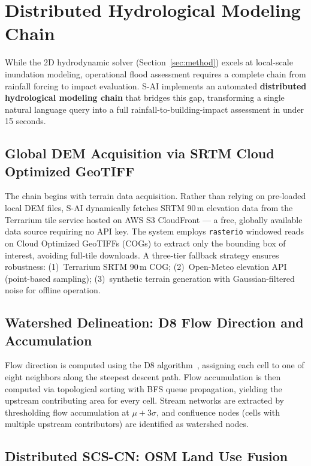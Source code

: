 \documentclass[11pt, a4paper]{article}
\begin{document}
\section{Distributed Hydrological Modeling Chain}
\label{sec:hydro}

While the 2D hydrodynamic solver (Section~\ref{sec:method}) excels at local-scale inundation modeling, operational flood assessment requires a complete chain from rainfall forcing to impact evaluation. S-AI implements an automated \textbf{distributed hydrological modeling chain} that bridges this gap, transforming a single natural language query into a full rainfall-to-building-impact assessment in under 15 seconds.

\subsection{Global DEM Acquisition via SRTM Cloud Optimized GeoTIFF}

The chain begins with terrain data acquisition. Rather than relying on pre-loaded local DEM files, S-AI dynamically fetches SRTM 90\,m elevation data from the Terrarium tile service hosted on AWS S3 CloudFront --- a free, globally available data source requiring no API key. The system employs \texttt{rasterio} windowed reads on Cloud Optimized GeoTIFFs (COGs) to extract only the bounding box of interest, avoiding full-tile downloads. A three-tier fallback strategy ensures robustness: (1)~Terrarium SRTM 90\,m COG; (2)~Open-Meteo elevation API (point-based sampling); (3)~synthetic terrain generation with Gaussian-filtered noise for offline operation.

\subsection{Watershed Delineation: D8 Flow Direction and Accumulation}

Flow direction is computed using the D8 algorithm~\cite{o1988d8}, assigning each cell to one of eight neighbors along the steepest descent path. Flow accumulation is then computed via topological sorting with BFS queue propagation, yielding the upstream contributing area for every cell. Stream networks are extracted by thresholding flow accumulation at $\mu + 3\sigma$, and confluence nodes (cells with multiple upstream contributors) are identified as watershed nodes.

\subsection{Distributed SCS-CN: OSM Land Use Fusion}
\label{sec:scscn}
\end{document}
